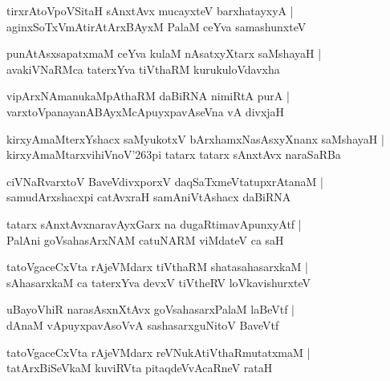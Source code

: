 \documentclass[twoside,12pt,openright]{book}
\def\S{\char'263}
\newcounter{shloka}[chapter]
\begin{document}
\begin{shloka}
tirxrAtoVpoVSitaH sAnxtAvx mucayxteV barxhatayxyA |\\
aginxSoTxVmAtirAtArxBAyxM PalaM ceYva samashunxteV 
\end{shloka}

\begin{shloka}
punAtAsxsapatxmaM ceYva kulaM nAsatxyXtarx saMshayaH |\\
avakiVNaRMca taterxYva tiVthaRM kurukuloVdavxha 
\end{shloka}

\begin{shloka}
vipArxNAmanukaMpAthaRM daBiRNA nimiRtA purA |\\
varxtoVpanayanABAyxMcApuyxpavAseVna vA divxjaH 
\end{shloka}

\begin{shloka}
kirxyAmaMterxYshacx saMyukotxV bArxhamxNasAsxyXnanx saMshayaH |\\
kirxyAmaMtarxvihiVnoV\S pi tatarx tatarx sAnxtAvx naraSaRBa
\end{shloka}

\begin{shloka}
ciVNaRvarxtoV BaveVdivxporxV daqSaTxmeVtatupxrAtanaM |\\
samudArxshacxpi catAvxraH samAniVtAshacx daBiRNA 
\end{shloka}

\begin{shloka}
tatarx sAnxtAvxnaravAyxGarx na dugaRtimavApunxyAtf |\\
PalAni goVsahasArxNAM catuNARM viMdateV ca saH
\end{shloka}

\begin{shloka}
tatoVgaceCxVta rAjeVMdarx tiVthaRM shatasahasarxkaM |\\
sAhasarxkaM  ca taterxYva devxV tiVtheRV loVkavishurxteV 
\end{shloka}

\begin{shloka}
uBayoVhiR narasAsxnXtAvx goVsahasarxPalaM laBeVtf |\\
dAnaM  vApuyxpavAsoVvA sashasarxguNitoV BaveVtf 
\end{shloka}

\begin{shloka}
tatoVgaceCxVta rAjeVMdarx reVNukAtiVthaRmutatxmaM |\\
tatArxBiSeVkaM kuviRVta pitaqdeVvAcaRneV rataH
\end{shloka}
\end{document}
